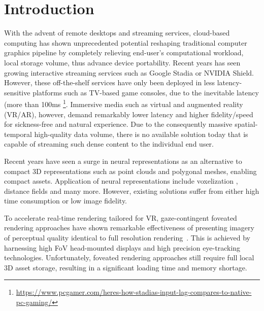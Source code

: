 \section{Introduction}


With the advent of remote desktops and streaming services, cloud-based computing has shown unprecedented potential reshaping traditional computer graphics pipeline by completely relieving end-user's computational workload, local storage volume, thus advance device portability. Recent years has seen growing interactive streaming services such as Google Stadia or NVIDIA Shield. 
However, these off-the-shelf services have only been deployed in less latency-sensitive platforms such as TV-based game consoles, due to the inevitable latency (more than 100ms \footnote{\url{https://www.pcgamer.com/heres-how-stadias-input-lag-compares-to-native-pc-gaming/}}. Immersive media such as virtual and augmented reality (VR/AR), however, demand remarkably lower latency and higher fidelity/speed for sickness-free and natural experience. 
Due to the consequently massive spatial-temporal high-quality data volume, there is no available solution today that is capable of streaming such dense content to the individual end user.


Recent years have seen a surge in neural representations as an alternative to compact 3D representations such as point clouds and polygonal meshes, enabling compact assets. Application of neural representations include voxelization \cite{sitzmann2019deepvoxels}, distance fields \cite{sitzmann2019metasdf,mildenhall2020nerf} and many more. However, existing solutions suffer from either high time consumption or low image fidelity. 

To accelerate real-time rendering tailored for VR, gaze-contingent foveated rendering approaches have shown remarkable effectiveness of presenting imagery of perceptual quality identical to full resolution rendering~\cite{Patney:2016:TFR}. This is achieved by harnessing high FoV head-mounted displays and high precision eye-tracking technologies. Unfortunately, foveated rendering approaches still require full local 3D asset storage, resulting in a significant loading time and memory shortage.


